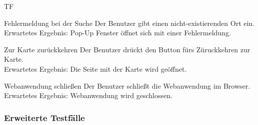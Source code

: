 \begin{Kriterien}{TF}
	\item[Fehlermeldung bei der Suche] Der Benutzer gibt einen nicht-existierenden Ort ein. \\ Erwartetes Ergebnis: Pop-Up Fenster öffnet sich mit einer Fehlermeldung.
	
	\item[Zur Karte zurückkehren] Der Benutzer drückt den Button fürs Züruckkehren zur Karte. \\ Erwartetes Ergebnis: Die Seite mit der Karte wird geöffnet. 
	
	\item[Webanwendung schließen] Der Benutzer schließt die Webanwendung im Browser. \\ Erwartetes Ergebnis: Webanwendung wird geschlossen.
\end{Kriterien}
\subsubsection{Erweiterte Testfälle}
